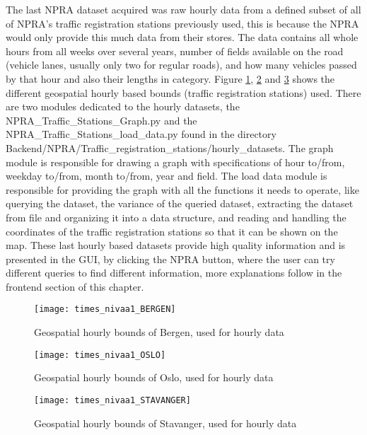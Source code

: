 The last NPRA dataset acquired was raw hourly data from a defined subset of all of NPRA's traffic registration stations previously used, this is because the NPRA would only provide this much data from their stores. The data contains all whole hours from all weeks over several years, number of fields available on the road (vehicle lanes, usually only two for regular roads), and how many vehicles passed by that hour and also their lengths in category. Figure \ref{fig:hboundsbergen}, \ref{fig:hboundsoslo} and \ref{fig:hboundsstavanger} shows the different geospatial hourly based bounds (traffic registration stations) used. There are two modules dedicated to the hourly datasets, the NPRA\_Traffic\_Stations\_Graph.py and the NPRA\_Traffic\_Stations\_load\_data.py found in the directory
Backend/NPRA/Traffic\_registration\_stations/hourly\_datasets. The graph module is responsible for drawing a graph with specifications of hour to/from, weekday to/from, month to/from, year and field. The load data module is responsible for providing the graph with all the functions it needs to operate, like querying the dataset, the variance of the queried dataset, extracting the dataset from file and organizing it into a data structure, and reading and handling the coordinates of the traffic registration stations so that it can be shown on the map. These last hourly based datasets provide high quality information and is presented in the GUI, by clicking the NPRA button, where the user can try different queries to find different information, more explanations follow in the frontend section of this chapter.

\begin{figure}[!htb]
\texttt{[image: times\_nivaa1\_BERGEN]}
\centering
\caption{Geospatial hourly bounds of Bergen, used for hourly data}
\label{fig:hboundsbergen}
\end{figure}

\begin{figure}[!htb]
\texttt{[image: times\_nivaa1\_OSLO]}
\centering
\caption{Geospatial hourly bounds of Oslo, used for hourly data}
\label{fig:hboundsoslo}
\end{figure}

\begin{figure}[!htb]
\texttt{[image: times\_nivaa1\_STAVANGER]}
\centering
\caption{Geospatial hourly bounds of Stavanger, used for hourly data}
\label{fig:hboundsstavanger}
\end{figure}

\newpage







